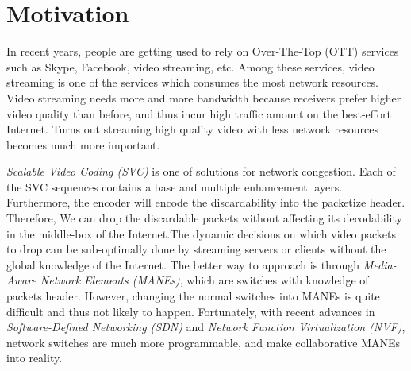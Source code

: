 \section{Motivation} \label{sec:motivation}

In recent years, people are getting used to rely on Over-The-Top (OTT) 
services such as Skype, Facebook, video streaming, etc. 
Among these services, video streaming is one of the services which 
consumes the most network resources. Video streaming needs more and more bandwidth because receivers prefer higher video quality than before, and thus incur high traffic amount on the best-effort Internet. Turns out streaming high quality video with less network resources becomes much more important.

{\em Scalable Video Coding (SVC) }is one of solutions for network congestion. Each of the SVC sequences contains a base and multiple enhancement layers. Furthermore, the encoder will encode the discardability into the packetize header. Therefore, We can drop the discardable packets without affecting its decodability in the middle-box of the Internet.The dynamic decisions on which video packets to drop can be sub-optimally done by streaming servers or clients without the global knowledge of the Internet. The better way to approach is through {\em Media-Aware Network Elements (MANEs)}, which are switches with knowledge of packets header. However, changing the normal switches into MANEs is quite difficult and thus not likely to happen. Fortunately, with recent advances in {\em Software-Defined Networking (SDN)} and {\em Network Function Virtualization (NVF)}, network switches are much more programmable, and make collaborative MANEs into reality. 




